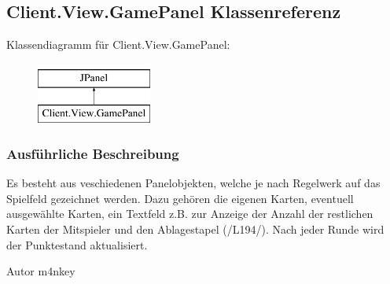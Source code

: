\hypertarget{a00041}{\subsection{Client.\-View.\-Game\-Panel Klassenreferenz}
\label{a00041}
}
Klassendiagramm für Client.\-View.\-Game\-Panel\-:\begin{figure}[H]
\begin{center}
\leavevmode
\includegraphics[height=2.000000cm]{a00041}
\end{center}
\end{figure}


\subsubsection{Ausführliche Beschreibung}
Es besteht aus veschiedenen Panelobjekten, welche je nach Regelwerk auf das Spielfeld gezeichnet werden. Dazu gehören die eigenen Karten, eventuell ausgewählte Karten, ein Textfeld z.\-B. zur Anzeige der Anzahl der restlichen Karten der Mitspieler und den Ablagestapel (/\-L194/). Nach jeder Runde wird der Punktestand aktualisiert.

\begin{DoxyAuthor}{Autor}
m4nkey 
\end{DoxyAuthor}
